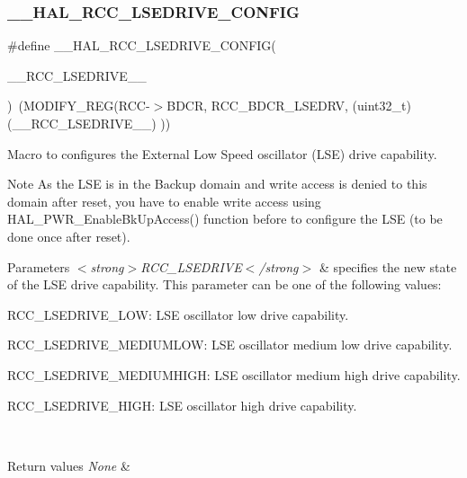\subsubsection{\texorpdfstring{\_\_HAL\_RCC\_LSEDRIVE\_CONFIG}{\_\_HAL\_RCC\_LSEDRIVE\_CONFIG}}
{\footnotesize\ttfamily \#define \+\_\+\+\_\+\+H\+A\+L\+\_\+\+R\+C\+C\+\_\+\+L\+S\+E\+D\+R\+I\+V\+E\+\_\+\+C\+O\+N\+F\+IG(\begin{DoxyParamCaption}\item[{}]{\+\_\+\+\_\+\+R\+C\+C\+\_\+\+L\+S\+E\+D\+R\+I\+V\+E\+\_\+\+\_\+ }\end{DoxyParamCaption})~(M\+O\+D\+I\+F\+Y\+\_\+\+R\+EG(R\+CC-\/$>$B\+D\+CR, R\+C\+C\+\_\+\+B\+D\+C\+R\+\_\+\+L\+S\+E\+D\+RV, (uint32\+\_\+t)(\+\_\+\+\_\+\+R\+C\+C\+\_\+\+L\+S\+E\+D\+R\+I\+V\+E\+\_\+\+\_\+) ))}



Macro to configures the External Low Speed oscillator (L\+SE) drive capability. 

\begin{DoxyNote}{Note}
As the L\+SE is in the Backup domain and write access is denied to this domain after reset, you have to enable write access using H\+A\+L\+\_\+\+P\+W\+R\+\_\+\+Enable\+Bk\+Up\+Access() function before to configure the L\+SE (to be done once after reset). 
\end{DoxyNote}

\begin{DoxyParams}{Parameters}
{\em $<$strong$>$\+R\+C\+C\+\_\+\+L\+S\+E\+D\+R\+I\+V\+E$<$/strong$>$} & specifies the new state of the L\+SE drive capability. This parameter can be one of the following values\+: \begin{DoxyItemize}
\item R\+C\+C\+\_\+\+L\+S\+E\+D\+R\+I\+V\+E\+\_\+\+L\+OW\+: L\+SE oscillator low drive capability. \item R\+C\+C\+\_\+\+L\+S\+E\+D\+R\+I\+V\+E\+\_\+\+M\+E\+D\+I\+U\+M\+L\+OW\+: L\+SE oscillator medium low drive capability. \item R\+C\+C\+\_\+\+L\+S\+E\+D\+R\+I\+V\+E\+\_\+\+M\+E\+D\+I\+U\+M\+H\+I\+GH\+: L\+SE oscillator medium high drive capability. \item R\+C\+C\+\_\+\+L\+S\+E\+D\+R\+I\+V\+E\+\_\+\+H\+I\+GH\+: L\+SE oscillator high drive capability. \end{DoxyItemize}
\\
\hline
\end{DoxyParams}

\begin{DoxyRetVals}{Return values}
{\em None} & \\
\hline
\end{DoxyRetVals}
\mbox{\label{group___r_c_c___get___clock__source_ga32f72b8c5b7e97b415867c57f9fafed6}} 
